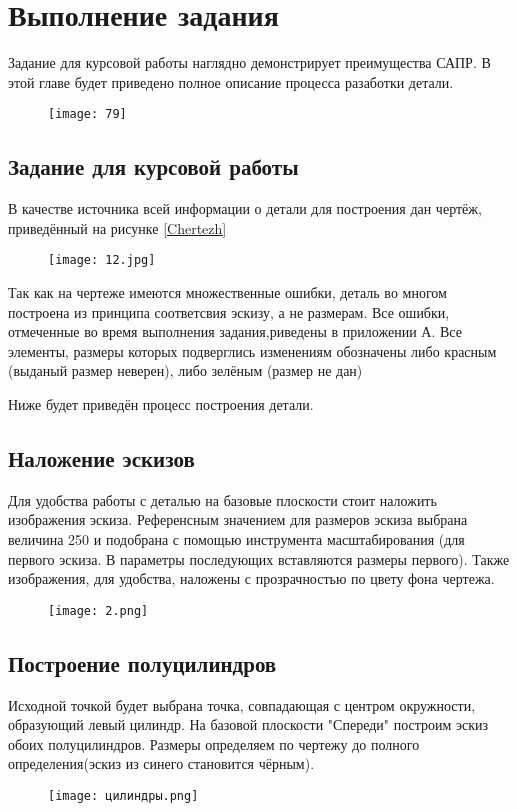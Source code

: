\chapter{Выполнение задания}
\label{cha:ch_2}
Задание для курсовой работы наглядно демонстрирует преимущества САПР. В этой главе будет приведено полное описание процесса разаботки детали.
\FloatBarrier
\begin{figure}[ht]
    \centering
    \texttt{[image: 79]}
\end{figure}
\FloatBarrier

\section{Задание для курсовой работы}
В качестве источника всей информации о детали для построения дан чертёж, приведённый на рисунке \ref{Chertezh}
\FloatBarrier
\begin{figure}[ht]
    \centering
    \texttt{[image: 12.jpg]}
\end{figure}
\label{Chertezh}
\FloatBarrier
Так как на чертеже имеются множественные ошибки, деталь во многом построена
из принципа соответсвия эскизу, а не размерам. Все ошибки, отмеченные во время выполнения задания,риведены в приложении А. 
Все элементы, размеры которых подверглись изменениям обозначены либо красным (выданый размер неверен), либо зелёным (размер не дан)
\par
Ниже будет приведён процесс построения детали.
\FloatBarrier
\section{Наложение эскизов}
Для удобства работы с деталью на базовые плоскости стоит наложить изображения эскиза. Референсным значением для размеров эскиза выбрана величина 250 и подобрана с помощью инструмента масштабирования (для первого эскиза. В параметры последующих вставляются размеры первого).
Также изображения, для удобства, наложены с прозрачностью по цвету фона чертежа.
\begin{figure}[ht]
    \centering
    \texttt{[image: 2.png]}
\end{figure}
\FloatBarrier

\section{Построение полуцилиндров}
Исходной точкой будет выбрана точка, совпадающая с центром окружности, образующий левый цилиндр. На базовой плоскости "Спереди" построим эскиз обоих полуцилиндров.
Размеры определяем по чертежу до полного определения(эскиз из синего становится чёрным). 
\FloatBarrier
\begin{figure}[ht]
    \centering
    \texttt{[image: цилиндры.png]}
\end{figure}
\FloatBarrier

